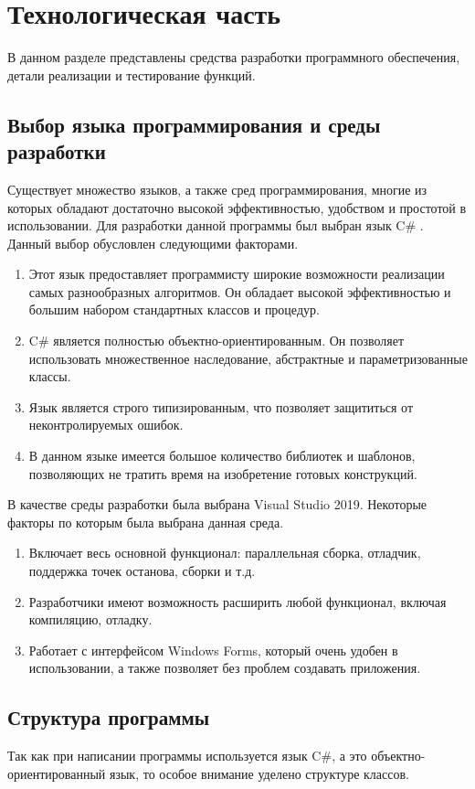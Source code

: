 \chapter{Технологическая часть}

В данном разделе представлены средства разработки программного обеспечения, детали реализации и тестирование функций.

\section{Выбор языка программирования и среды разработки}
Существует множество языков, а также сред программирования, многие из которых обладают достаточно высокой эффективностью, удобством и простотой в использовании. Для разработки данной программы был выбран язык C\# \cite{csharplang}. Данный выбор обусловлен следующими факторами.

\begin{enumerate}
	\item Этот язык предоставляет программисту широкие возможности реализации самых разнообразных алгоритмов. Он обладает высокой эффективностью и большим набором стандартных классов и процедур.
	\item C\# является полностью объектно-ориентированным. Он позволяет использовать множественное наследование, абстрактные и параметризованные классы.
	\item Язык является строго типизированным, что позволяет защититься от неконтролируемых  ошибок.
	\item В данном языке имеется большое количество библиотек и шаблонов, позволяющих не тратить время на изобретение готовых конструкций.
\end{enumerate}

В качестве среды разработки была выбрана Visual Studio 2019. Некоторые факторы по которым была выбрана данная среда.
\begin{enumerate}
	\item Включает весь основной функционал: параллельная сборка, отладчик, поддержка точек останова, сборки и т.д.
	\item Разработчики имеют возможность расширить любой функционал, включая компиляцию, отладку.
	\item Работает с интерфейсом Windows Forms, который очень удобен в использовании, а также позволяет без проблем создавать приложения.
\end{enumerate}

\section{Структура программы}
Так как при написании программы используется язык C\#, а это объектно-ориентированный язык, то особое внимание уделено структуре классов.


